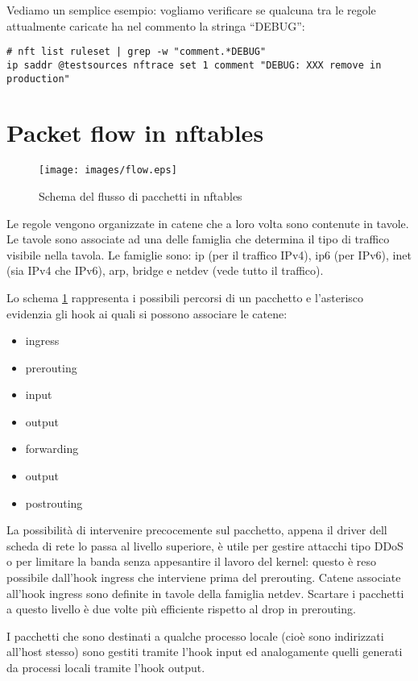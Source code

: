 Vediamo un semplice esempio: vogliamo verificare se qualcuna tra le regole
attualmente caricate ha nel commento la stringa ``DEBUG'':
\begin{lstlisting}
# nft list ruleset | grep -w "comment.*DEBUG"
ip saddr @testsources nftrace set 1 comment "DEBUG: XXX remove in production"
\end{lstlisting}

\section{Packet flow in nftables}

\begin{figure}[H]
    \centering
    \texttt{[image: images/flow.eps]}
    \caption{Schema del flusso di pacchetti in nftables}
    \label{fig:flow}
\end{figure}
Le regole vengono organizzate in catene che a loro volta sono contenute in
tavole. Le tavole sono associate ad una delle famiglia che determina il tipo
di traffico visibile nella tavola. Le famiglie sono: ip (per il traffico
IPv4), ip6 (per IPv6),
inet (sia IPv4 che IPv6), arp, bridge e netdev (vede tutto il traffico).

Lo schema \ref{fig:flow} rappresenta i possibili percorsi di un pacchetto e
l'asterisco evidenzia gli hook ai quali si possono associare le catene:
\begin{itemize}
    \item ingress
    \item prerouting
    \item input
    \item output
    \item forwarding
    \item output
    \item postrouting
\end{itemize}
La possibilit\`a di intervenire precocemente sul pacchetto, appena il driver
dell scheda di rete lo passa al livello superiore, \`e utile per gestire
attacchi tipo DDoS o per limitare la banda senza appesantire il lavoro del
kernel: questo \`e reso possibile dall'hook ingress che interviene prima del
prerouting.
Catene associate all'hook ingress sono definite in tavole della
famiglia netdev. Scartare i pacchetti a questo livello \`e due volte
pi\`u efficiente rispetto al drop in prerouting.

I pacchetti che sono destinati a qualche processo locale (cioè sono indirizzati
all'host stesso) sono gestiti tramite l'hook input ed analogamente quelli
generati da processi locali tramite l'hook output.


